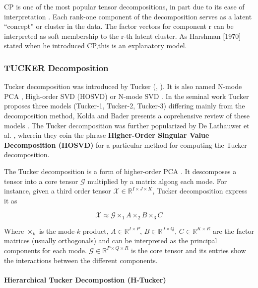 \documentclass[letterpaper,12pt]{article}
\begin{document}
CP is one of the most popular tensor decompositions, in part due to its ease of interpretation \cite{Papalexakis2016}. Each rank-one component of the decomposition serves as a latent “concept” or cluster in the data. The factor vectors for component r can be interpreted as soft membership to the r-th latent cluster. As Harshman [1970] stated when he introduced CP,this is an explanatory model.


\subsubsection{TUCKER Decomposition}

Tucker decomposition was introduced by Tucker (\cite{Tucker1963}, \cite{Tucker1964}). It is also named N-mode PCA \cite{Kapteyn1986}, High-order SVD (HOSVD) \cite{DeLathauwer2000} or N-mode SVD \cite{Vasilescu2002}. In the seminal work Tucker \cite{Tucker1966} proposes three models (Tucker-1, Tucker-2, Tucker-3) differing mainly from the decomposition method, Kolda and Bader presents a coprehensive review of these models \cite{Kolda2009}. The Tucker decomposition was further popularized by De Lathauwer et al. \cite{DeLathauwer2000}, wherein they coin the phrase \textbf{Higher-Order Singular Value Decomposition (HOSVD)} for a particular method for computing the Tucker decomposition.

The Tucker decomposition is a form of higher-order PCA \cite{Kolda2009}. It descomposes a tensor into a core tensor $\mathcal{G}$ multiplied by a matrix algong each mode. For instance, given a third order tensor $\mathcal{X}\in\mathbb{R}^{I\times J\times K}$, Tucker decomposition express it as 

\begin{equation}
 \mathcal{X}\approx \mathcal{G}\times_1 A \times_2 B \times_3 C
\end{equation}

Where $\times_k$ is the mode-$k$ product, $A\in \mathbb{R}^{I\times P}$, $B\in \mathbb{R}^{J\times Q}$, $C\in \mathbb{R}^{K\times R}$ are the factor matrices (usually orthogonals) and can be interpreted as the principal components for each mode. $\mathcal{G}\in\mathbb{R}^{P\times Q \times R}$ is the core tensor and its entries show the interactions between the different components.

\paragraph{Hierarchical Tucker Decompostion (H-Tucker)}
\end{document}
